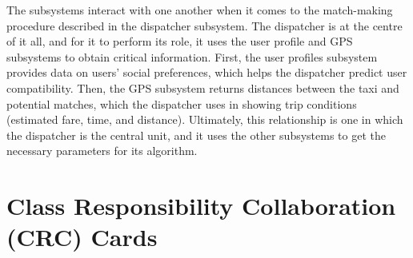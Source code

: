 \documentclass[]{article}
\begin{document}
The subsystems interact with one another when it comes to the match-making procedure described in the dispatcher subsystem. The dispatcher is at the centre of it all, and for it to perform its role, it uses the user profile and GPS subsystems to obtain critical information. First, the user profiles subsystem provides data on users’ social preferences, which helps the dispatcher predict user compatibility. Then, the GPS subsystem returns distances between the taxi and potential matches, which the dispatcher uses in showing trip conditions (estimated fare, time, and distance). Ultimately, this relationship is one in which the dispatcher is the central unit, and it uses the other subsystems to get the necessary parameters for its algorithm.
\\

	
\section{Class Responsibility Collaboration (CRC) Cards}
\label{sec:class_responsibility_collaboration_crc_cards}
\end{document}
